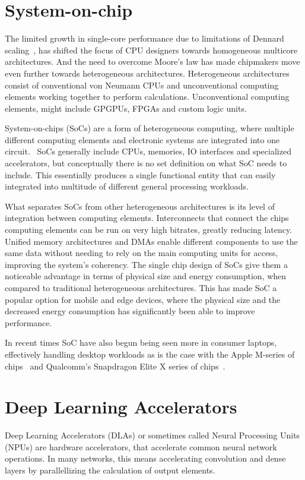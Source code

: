 \documentclass[12pt,a4paper,english
]{tunithesis}
\begin{document}
\section{System-on-chip}
The limited growth in single-core performance due to limitations of Dennard scaling~\cite{esmaeilzadeh_dark_2011}, has shifted the focus of CPU designers towards homogeneous multicore architectures.
And the need to overcome Moore's law has made chipmakers move even further towards heterogeneous architectures. Heterogeneous architectures consist of conventional von Neumann CPUs and unconventional computing elements working together to perform calculations. Unconventional computing elements, might include GPGPUs, FPGAs and custom logic units.~\cite{chung_single-chip_2010}

System-on-chips (SoCs) are a form of heterogeneous computing, where multiple different computing elements and electronic systems are integrated into one circuit.~\cite{Greaves2021}
SoCs generally include CPUs, memories, IO interfaces and specialized accelerators, but conceptually there is no set definition on what SoC needs to include.
This essentially produces a single functional entity that can easily integrated into multitude of different general processing workloads.

What separates SoCs from other heterogeneous architectures is its level of integration between computing elements. Interconnects that connect the chips computing elements can be run on very high bitrates, greatly reducing latency. Unified memory architectures and DMAs enable different components to use the same data without needing to rely on the main computing units for access, improving the system's coherency. The single chip design of SoCs give them a noticeable advantage in terms of physical size and energy consumption, when compared to traditional heterogeneous architectures. This has made SoC a popular option for mobile and edge devices, where the physical size and the decreased energy consumption has significantly been able to improve performance.\cite{di_natale_moving_2010}

In recent times SoC have also begun being seen more in consumer laptops, effectively handling desktop workloads as is the case with the Apple M-series of chips~\cite{apple_m1} and Qualcomm's Snapdragon Elite X series of  chips~\cite{snapdragon_x_elite}.



\section{Deep Learning Accelerators}
\label{sec:dlas}
Deep Learning Accelerators (DLAs) or sometimes called Neural Processing Units (NPUs) are hardware accelerators, that accelerate common neural network operations. In many networks, this means accelerating convolution and dense layers by parallellizing the calculation of output elements.
\end{document}
